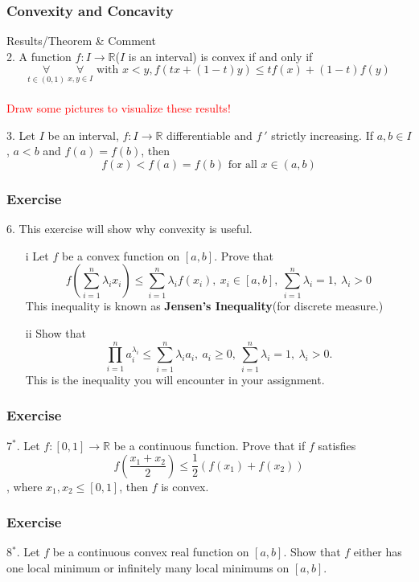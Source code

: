\documentclass{beamer}
\begin{document}
\begin{frame}
    \frametitle{Convexity and Concavity}
Results/Theorem \& Comment\\
\vspace{1em}
2. A function $f:I\rightarrow\mathbb{R}$($I$ is an interval) is convex if and only if 
\begin{equation*}
    \underset{t\in(0,1)}{\forall}\ \underset{x,y\in I}{\forall}\text{ with } x<y, f(tx+(1-t)y)\leq tf(x)+(1-t)f(y)
\end{equation*}\\

\textcolor{red}{Draw some pictures to visualize these results!}

\vspace{2em}

3. Let $I$ be an interval, $f:I\rightarrow\mathbb{R}$ differentiable and $f~'$ strictly increasing. If $a, b\in I$, $a<b$ and 
$f(a)=f(b)$, then 
\begin{equation*}
    f(x)<f(a)=f(b)\text{ for all }x\in(a,b)
\end{equation*}

\end{frame}

\begin{frame}
    \frametitle{Exercise}
6. This exercise will show why convexity is useful. 
\begin{enumerate}
    \item[i]    Let $f$ be a convex function on $[a,b]$. Prove that 
        \begin{equation*}
            f(\sum^n_{i=1}\lambda_i x_i)\leq \sum^n_{i=1}\lambda_i f(x_i),\ x_i\in[a,b],\ \sum^n_{i=1}\lambda_i=1,\ \lambda_i>0
        \end{equation*}
        This inequality is known as \textbf{Jensen's Inequality}(for discrete measure.)
    \item[ii] Show that 
        \begin{equation*}
            \prod^n_{i=1} a_i^{\lambda_i}\leq \sum^n_{i=1}\lambda_i a_i,\ a_i\geq 0,\ \sum^n_{i=1}\lambda_i=1,\ \lambda_i>0.
        \end{equation*}
        This is the inequality you will encounter in your assignment.
\end{enumerate}
\end{frame}


\begin{frame}
    \frametitle{Exercise}
7$^*$. Let $f:[0,1]\rightarrow\mathbb{R}$ be a continuous function. Prove that if $f$ satisfies 
\begin{equation*}
    f(\frac{x_1+x_2}{2})\leq \frac{1}{2}(f(x_1)+f(x_2))
\end{equation*}
, where $x_1,x_2\leq[0,1]$, then $f$ is convex.
\end{frame}
\begin{frame}
    \frametitle{Exercise}
8$^*$. Let $f$ be a continuous convex real function on $[a,b]$. Show that $f$ either has one local minimum or infinitely many local minimums on $[a,b]$.
\end{frame}
\end{document}
